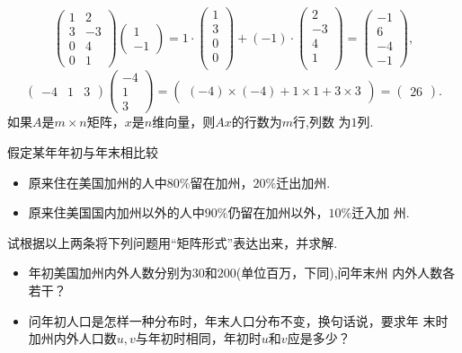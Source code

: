 ﻿\documentclass{book} \usepackage{exsheets} \usepackage{xeCJK}
\begin{document}
\begin{solution}
$$
  \begin{pmatrix}
    1&2\\
    3&-3\\
    0&4\\
    0&1
  \end{pmatrix}
  \begin{pmatrix}
    1\\
    -1
  \end{pmatrix}=1\cdot
  \begin{pmatrix}
    1\\
    3\\
    0\\
    0\\
  \end{pmatrix}+(-1)\cdot
  \begin{pmatrix}
    2\\
    -3\\
    4\\
    1\\
  \end{pmatrix}=
  \begin{pmatrix}
    -1\\
    6\\
    -4\\
    -1
  \end{pmatrix},
$$
$$
\begin{pmatrix}
  -4&1&3
\end{pmatrix}
\begin{pmatrix}
  -4\\
  1\\
  3
\end{pmatrix}=\begin{pmatrix}(-4)\times (-4)+1\times 1+3\times
  3\end{pmatrix}=\begin{pmatrix}26\end{pmatrix}.
$$
如果$A$是$m\times n$矩阵，$x$是$n$维向量，则$Ax$的行数为$m$行,列数
为$1$列.
\end{solution}
\begin{question}
  假定某年年初与年末相比较
  \begin{itemize}
  \item 原来住在美国加州的人中$80\%$留在加州，$20\%$迁出加州.
  \item 原来住美国国内加州以外的人中$90\%$仍留在加州以外，$10\%$迁入加
    州.
  \end{itemize}
  试根据以上两条将下列问题用“矩阵形式”表达出来，并求解.
  \begin{itemize}
  \item 年初美国加州内外人数分别为$30$和$200$(单位百万，下同),问年末州
    内外人数各若干？
  \item 问年初人口是怎样一种分布时，年末人口分布不变，换句话说，要求年
    末时加州内外人口数$u,v$与年初时相同，年初时$u$和$v$应是多少？
  \end{itemize}
\end{question}
\end{document}
